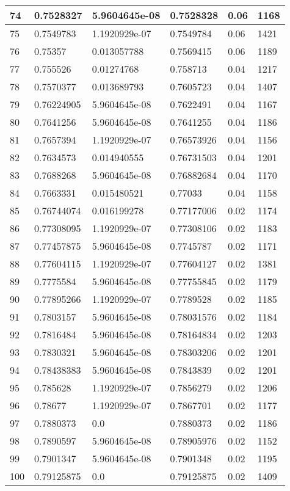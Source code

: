\begin{longtable}{|l|l|l|l|l|l|}
74 & 0.7528327 & 5.9604645e-08 & 0.7528328 & 0.06 & 1168 \\ \hline 
75 & 0.7549783 & 1.1920929e-07 & 0.7549784 & 0.06 & 1421 \\ \hline 
76 & 0.75357 & 0.013057788 & 0.7569415 & 0.06 & 1189 \\ \hline 
77 & 0.755526 & 0.01274768 & 0.758713 & 0.04 & 1217 \\ \hline 
78 & 0.7570377 & 0.013689793 & 0.7605723 & 0.04 & 1407 \\ \hline 
79 & 0.76224905 & 5.9604645e-08 & 0.7622491 & 0.04 & 1167 \\ \hline 
80 & 0.7641256 & 5.9604645e-08 & 0.7641255 & 0.04 & 1186 \\ \hline 
81 & 0.7657394 & 1.1920929e-07 & 0.76573926 & 0.04 & 1156 \\ \hline 
82 & 0.7634573 & 0.014940555 & 0.76731503 & 0.04 & 1201 \\ \hline 
83 & 0.7688268 & 5.9604645e-08 & 0.76882684 & 0.04 & 1170 \\ \hline 
84 & 0.7663331 & 0.015480521 & 0.77033 & 0.04 & 1158 \\ \hline 
85 & 0.76744074 & 0.016199278 & 0.77177006 & 0.02 & 1174 \\ \hline 
86 & 0.77308095 & 1.1920929e-07 & 0.77308106 & 0.02 & 1183 \\ \hline 
87 & 0.77457875 & 5.9604645e-08 & 0.7745787 & 0.02 & 1171 \\ \hline 
88 & 0.77604115 & 1.1920929e-07 & 0.77604127 & 0.02 & 1381 \\ \hline 
89 & 0.7775584 & 5.9604645e-08 & 0.77755845 & 0.02 & 1179 \\ \hline 
90 & 0.77895266 & 1.1920929e-07 & 0.7789528 & 0.02 & 1185 \\ \hline 
91 & 0.7803157 & 5.9604645e-08 & 0.78031576 & 0.02 & 1184 \\ \hline 
92 & 0.7816484 & 5.9604645e-08 & 0.78164834 & 0.02 & 1203 \\ \hline 
93 & 0.7830321 & 5.9604645e-08 & 0.78303206 & 0.02 & 1201 \\ \hline 
94 & 0.78438383 & 5.9604645e-08 & 0.7843839 & 0.02 & 1201 \\ \hline 
95 & 0.785628 & 1.1920929e-07 & 0.7856279 & 0.02 & 1206 \\ \hline 
96 & 0.78677 & 1.1920929e-07 & 0.7867701 & 0.02 & 1177 \\ \hline 
97 & 0.7880373 & 0.0 & 0.7880373 & 0.02 & 1186 \\ \hline 
98 & 0.7890597 & 5.9604645e-08 & 0.78905976 & 0.02 & 1152 \\ \hline 
99 & 0.7901347 & 5.9604645e-08 & 0.7901348 & 0.02 & 1195 \\ \hline 
100 & 0.79125875 & 0.0 & 0.79125875 & 0.02 & 1409 \\ \hline 
\end{longtable}
